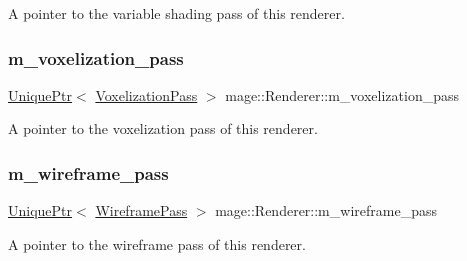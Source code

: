 A pointer to the variable shading pass of this renderer. \hypertarget{classmage_1_1_renderer_a763f835f495bb7784a71c95178755dc4}{}\label{classmage_1_1_renderer_a763f835f495bb7784a71c95178755dc4} 
\subsubsection{\texorpdfstring{m\+\_\+voxelization\+\_\+pass}{m\_voxelization\_pass}}
{\footnotesize\ttfamily \hyperlink{namespacemage_a3316d7143a973e37adf1110f2e80ca31}{Unique\+Ptr}$<$ \hyperlink{classmage_1_1_voxelization_pass}{Voxelization\+Pass} $>$ mage\+::\+Renderer\+::m\+\_\+voxelization\+\_\+pass\hspace{0.3cm}{\ttfamily [private]}}

A pointer to the voxelization pass of this renderer. \hypertarget{classmage_1_1_renderer_a8c9f28228031337e26725af8213268ed}{}\label{classmage_1_1_renderer_a8c9f28228031337e26725af8213268ed} 
\subsubsection{\texorpdfstring{m\+\_\+wireframe\+\_\+pass}{m\_wireframe\_pass}}
{\footnotesize\ttfamily \hyperlink{namespacemage_a3316d7143a973e37adf1110f2e80ca31}{Unique\+Ptr}$<$ \hyperlink{classmage_1_1_wireframe_pass}{Wireframe\+Pass} $>$ mage\+::\+Renderer\+::m\+\_\+wireframe\+\_\+pass\hspace{0.3cm}{\ttfamily [private]}}

A pointer to the wireframe pass of this renderer. 